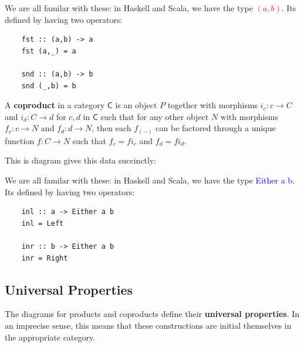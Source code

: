 \documentclass[tikz]{beamer}
\newcommand{\cat}[1]{\bm{ \mathsf{#1} }}
\newcommand{\cc}{\cat{C}}
\newcommand{\mred}[1]{\textcolor{red}{$#1$}}
\newcommand{\blue}[1]{\textcolor{blue}{#1}}
\theoremstyle{definition}
\begin{document}
\begin{frame}[fragile]
	We are all familar with these: in Haskell and Scala, we have the type \mred{(a, b)}. Its defined by having two operators: 
	
	\begin{verbatim}
	fst :: (a,b) -> a
	fst (a,_) = a
	
	snd :: (a,b) -> b
	snd (_,b) = b
	\end{verbatim}
\end{frame}

\frame
{ 
	\begin{definition}[Coproduct]
	
		A \textbf{coproduct} in a category $\cc$ is an object $P$ together with morphisms $i_c : c \to C $ and $i_d : C \to d$ for $c,d$ in $\cc$ such that for any other object $N$ with morphisms $f_c : c \to N$ and $f_d : d \to N$, then each $f_{(-)}$ can be factored through a unique function $f : C \to N$ such that $f_c = fi_c$ and $f_d = fi_d$. 
	\end{definition}
	
}

\begin{frame}[fragile]
	This is diagram gives this data succinctly: 
	
	\begin{center}
	\end{center}
\end{frame}

\begin{frame}[fragile]
	We are all familar with these: in Haskell and Scala, we have the type \blue{Either} \blue{a} \blue{b}. Its defined by having two operators: 
	
	\begin{verbatim}
	inl :: a -> Either a b
	inl = Left
	
	inr :: b -> Either a b
	inr = Right
	\end{verbatim}
\end{frame}

\subsection{Universal Properties}
\frame
{
	The diagrams for products and coproducts define their \textbf{universal properties}. In an imprecise sense, this means that these constructions are initial themselves in the appropriate category. 
}
\end{document}
